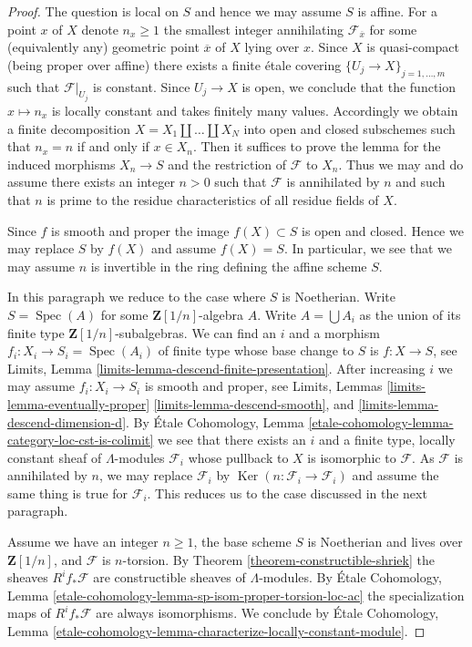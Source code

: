\documentclass{stacks-project}
\theoremstyle{plain}
\theoremstyle{definition}
\theoremstyle{remark}
\numberwithin{equation}{subsection}
\def\Spec{\mathop{\mathrm{Spec}}}
\def\Ker{\mathop{\mathrm{Ker}}}
\begin{document}
\begin{proof}
The question is local on $S$ and hence we may assume $S$ is affine.
For a point $x$ of $X$ denote $n_x \geq 1$
the smallest integer annihilating $\mathcal{F}_{\overline{x}}$
for some (equivalently any) geometric point $\overline{x}$ of $X$
lying over $x$. Since $X$ is quasi-compact (being proper over affine)
there exists a finite \'etale covering $\{U_j \to X\}_{j = 1, \ldots, m}$
such that $\mathcal{F}|_{U_j}$ is constant. Since $U_j \to X$
is open, we conclude that the function $x \mapsto n_x$ is locally
constant and takes finitely many values. Accordingly we
obtain a finite decomposition $X = X_1 \amalg \ldots \amalg X_N$
into open and closed subschemes such that $n_x = n$ if and only if $x \in X_n$.
Then it suffices to prove the lemma for the induced
morphisms $X_n \to S$ and the restriction of $\mathcal{F}$ to $X_n$.
Thus we may and do assume there exists an integer $n > 0$ such
that $\mathcal{F}$ is annihilated by $n$ and such that $n$
is prime to the residue characteristics of all residue fields of $X$.

\medskip\noindent
Since $f$ is smooth and proper the image $f(X) \subset S$ is open and closed.
Hence we may replace $S$ by $f(X)$ and assume $f(X) = S$. In particular,
we see that we may assume $n$ is invertible in the ring defining the
affine scheme $S$.

\medskip\noindent
In this paragraph we reduce to the case where $S$ is Noetherian.
Write $S = \Spec(A)$ for some $\mathbf{Z}[1/n]$-algebra $A$.
Write $A = \bigcup A_i$ as the union of its finite type
$\mathbf{Z}[1/n]$-subalgebras. We can find an $i$ and a morphism
$f_i : X_i \to S_i = \Spec(A_i)$ of finite
type whose base change to $S$ is $f : X \to S$, see
Limits, Lemma \ref{limits-lemma-descend-finite-presentation}.
After increasing $i$ we may assume $f_i : X_i \to S_i$ is
smooth and proper, see Limits, Lemmas
\ref{limits-lemma-eventually-proper}
\ref{limits-lemma-descend-smooth}, and
\ref{limits-lemma-descend-dimension-d}.
By \'Etale Cohomology, Lemma
\ref{etale-cohomology-lemma-category-loc-cst-is-colimit}
we see that there exists an $i$ and a finite type,
locally constant sheaf of $\Lambda$-modules
$\mathcal{F}_i$ whose pullback to $X$ is isomorphic to $\mathcal{F}$.
As $\mathcal{F}$ is annihilated by $n$, we may replace
$\mathcal{F}_i$ by $\Ker(n : \mathcal{F}_i \to \mathcal{F}_i)$
and assume the same thing is true for $\mathcal{F}_i$.
This reduces us to the case discussed in the next paragraph.

\medskip\noindent
Assume we have an integer $n \geq 1$, the base scheme $S$ is Noetherian
and lives over $\mathbf{Z}[1/n]$, and $\mathcal{F}$ is $n$-torsion.
By Theorem \ref{theorem-constructible-shriek}
the sheaves $R^if_*\mathcal{F}$ are constructible sheaves of $\Lambda$-modules.
By \'Etale Cohomology, Lemma
\ref{etale-cohomology-lemma-sp-isom-proper-torsion-loc-ac}
the specialization maps of $R^if_*\mathcal{F}$ are always isomorphisms.
We conclude by \'Etale Cohomology, Lemma
\ref{etale-cohomology-lemma-characterize-locally-constant-module}.
\end{proof}
\end{document}
